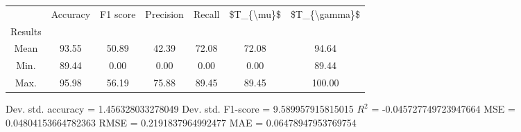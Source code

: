 \begin{tabular}{|c|c|c|c|c|c|c|}
\toprule
{} &  Accuracy &  F1 score &  Precision &  Recall &  \$T\_\{\textbackslash mu\}\$ &  \$T\_\{\textbackslash gamma\}\$ \\
Results &           &           &            &         &            &               \\
\hline
Mean    &     93.55 &     50.89 &      42.39 &   72.08 &      72.08 &         94.64 \\
Min.    &     89.44 &      0.00 &       0.00 &    0.00 &       0.00 &         89.44 \\
Max.    &     95.98 &     56.19 &      75.88 &   89.45 &      89.45 &        100.00 \\
\bottomrule
\end{tabular}

 Dev. std. accuracy = 1.456328033278049
 Dev. std. F1-score = 9.589957915815015
 $R^2$ = -0.045727749723947664
 MSE = 0.04804153664782363
 RMSE = 0.2191837964992477
 MAE = 0.06478947953769754